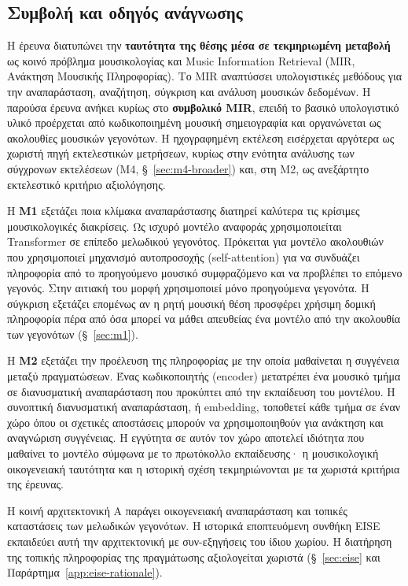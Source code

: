 \documentclass[11pt,a4paper]{article}
\begin{document}
\subsection{Συμβολή και οδηγός ανάγνωσης}

Η έρευνα διατυπώνει την \textbf{ταυτότητα της θέσης μέσα σε τεκμηριωμένη μεταβολή} ως κοινό πρόβλημα μουσικολογίας και Music Information Retrieval (MIR, Ανάκτηση Μουσικής Πληροφορίας). Το MIR αναπτύσσει υπολογιστικές μεθόδους για την αναπαράσταση, αναζήτηση, σύγκριση και ανάλυση μουσικών δεδομένων. Η παρούσα έρευνα ανήκει κυρίως στο \textbf{συμβολικό MIR}, επειδή το βασικό υπολογιστικό υλικό προέρχεται από κωδικοποιημένη μουσική σημειογραφία και οργανώνεται ως ακολουθίες μουσικών γεγονότων. Η ηχογραφημένη εκτέλεση εισέρχεται αργότερα ως χωριστή πηγή εκτελεστικών μετρήσεων, κυρίως στην ενότητα ανάλυσης των σύγχρονων εκτελέσεων (M4, §~\ref{sec:m4-broader}) και, στη M2, ως ανεξάρτητο εκτελεστικό κριτήριο αξιολόγησης.

Η \textbf{M1} εξετάζει ποια κλίμακα αναπαράστασης διατηρεί καλύτερα τις κρίσιμες μουσικολογικές διακρίσεις. Ως ισχυρό μοντέλο αναφοράς χρησιμοποιείται Transformer σε επίπεδο μελωδικού γεγονότος. Πρόκειται για μοντέλο ακολουθιών που χρησιμοποιεί μηχανισμό αυτοπροσοχής (self-attention) για να συνδυάζει πληροφορία από το προηγούμενο μουσικό συμφραζόμενο και να προβλέπει το επόμενο γεγονός. Στην αιτιακή του μορφή χρησιμοποιεί μόνο προηγούμενα γεγονότα. Η σύγκριση εξετάζει επομένως αν η ρητή μουσική θέση προσφέρει χρήσιμη δομική πληροφορία πέρα από όσα μπορεί να μάθει απευθείας ένα μοντέλο από την ακολουθία των γεγονότων (§~\ref{sec:m1}).

Η \textbf{M2} εξετάζει την προέλευση της πληροφορίας με την οποία μαθαίνεται η συγγένεια μεταξύ πραγματώσεων. Ένας κωδικοποιητής (encoder) μετατρέπει ένα μουσικό τμήμα σε διανυσματική αναπαράσταση που προκύπτει από την εκπαίδευση του μοντέλου. Η συνοπτική διανυσματική αναπαράσταση, ή embedding, τοποθετεί κάθε τμήμα σε έναν χώρο όπου οι σχετικές αποστάσεις μπορούν να χρησιμοποιηθούν για ανάκτηση και αναγνώριση συγγένειας. Η εγγύτητα σε αυτόν τον χώρο αποτελεί ιδιότητα που μαθαίνει το μοντέλο σύμφωνα με το πρωτόκολλο εκπαίδευσης· η μουσικολογική οικογενειακή ταυτότητα και η ιστορική σχέση τεκμηριώνονται με τα χωριστά κριτήρια της έρευνας.

Η κοινή αρχιτεκτονική A παράγει οικογενειακή αναπαράσταση και τοπικές καταστάσεις των μελωδικών γεγονότων. Η ιστορικά εποπτευόμενη συνθήκη EISE εκπαιδεύει αυτή την αρχιτεκτονική με συν-εξηγήσεις του ίδιου χωρίου. Η διατήρηση της τοπικής πληροφορίας της πραγμάτωσης αξιολογείται χωριστά (§~\ref{sec:eise} και Παράρτημα~\ref{app:eise-rationale}).
\end{document}
